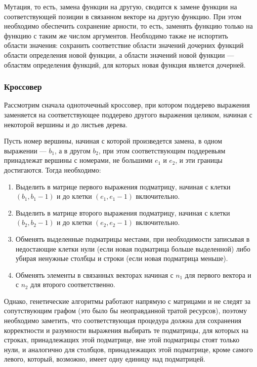 \documentclass[12pt,a4paper]{amsart}
\begin{document}
Мутация, то есть, замена функции на другую, сводится к замене функции на соответствующей позиции в связанном векторе
на другую функцию. При этом необходимо обеспечить сохранение арности, то есть, заменять функцию только на функцию с
таким же числом аргументов. Необходимо также не испортить области значения: сохранить соответствие области значений
дочерних функций области определения новой функции, а области значений новой функции --- областям определения функций,
для которых новая функция является дочерней.

\subsubsection{Кроссовер}

Рассмотрим сначала одноточечный кроссовер, при котором поддерево выражения заменяется на соответствующее поддерево
другого выражения целиком, начиная с некоторой вершины и до листьев дерева.

Пусть номер вершины, начиная с которой произведется замена, в одном выражении --- $b_1$, а в другом $b_2$, при этом
соответствующим поддеревьям принадлежат вершины с номерами, не большими $e_1$ и $e_2$, и эти границы достигаются.
Тогда необходимо:

\begin{enumerate}
  \item Выделить в матрице первого выражения подматрицу, начиная с клетки $ (b_1, b_1 - 1) $ и до клетки
	$ (e_1, e_1 - 1) $ включительно.
  \item Выделить в матрице второго выражения подматрицу, начиная с клетки $ (b_2, b_2 - 1) $ и до клетки
	$ (e_2, e_2 - 1) $ включительно.
  \item Обменять выделенные подматрицы местами, при необходимости записывая в недостающие клетки нули (если новая
	подматрица больше выделенной) либо убирая ненужные столбцы и строки (если новая подматрица меньше).
  \item Обменять элементы в связанных векторах начиная с $ n_1 $ для первого вектора и с $ n_2 $ для второго
	соответственно.
\end{enumerate}

Однако, генетические алгоритмы работают напрямую с матрицами и не следят за сопутствующим графом (это было бы
неоправданной тратой ресурсов), поэтому необходимо заметить, что соответствующая процедура должна для сохранения
корректности и разумности выражения выбирать те подматрицы, для которых на строках, принадлежащих этой подматрице,
вне этой подматрицы стоят только нули, и аналогично для столбцов, принадлежащих этой подматрице, кроме самого левого,
который, возможно, имеет одну единицу над подматрицей.
\end{document}

